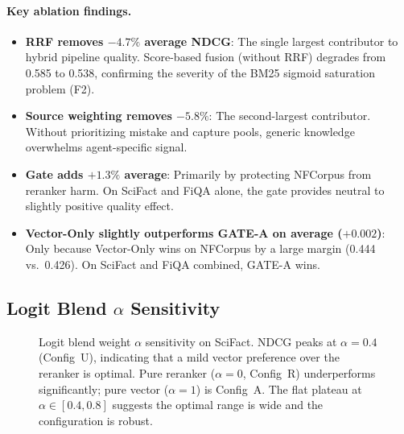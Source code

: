 \documentclass[11pt]{article}
\begin{document}
\paragraph{Key ablation findings.}
\begin{itemize}[leftmargin=2em, itemsep=3pt]
  \item \textbf{RRF removes $-4.7\%$ average NDCG}: The single largest contributor to
  hybrid pipeline quality. Score-based fusion (without RRF) degrades from 0.585 to
  0.538, confirming the severity of the BM25 sigmoid saturation problem (F2).
  \item \textbf{Source weighting removes $-5.8\%$}: The second-largest contributor. Without
  prioritizing mistake and capture pools, generic knowledge overwhelms agent-specific
  signal.
  \item \textbf{Gate adds $+1.3\%$ average}: Primarily by protecting NFCorpus from
  reranker harm. On SciFact and FiQA alone, the gate provides neutral to slightly
  positive quality effect.
  \item \textbf{Vector-Only slightly outperforms GATE-A on average ($+0.002$)}: Only
  because Vector-Only wins on NFCorpus by a large margin (0.444 vs.\ 0.426). On
  SciFact and FiQA combined, GATE-A wins.
\end{itemize}

\subsection{Logit Blend $\alpha$ Sensitivity}

\begin{figure}[H]
\centering
{}
\caption{Logit blend weight $\alpha$ sensitivity on SciFact. NDCG peaks at $\alpha=0.4$
(Config~U), indicating that a mild vector preference over the reranker is optimal.
Pure reranker ($\alpha=0$, Config~R) underperforms significantly; pure vector ($\alpha=1$)
is Config~A. The flat plateau at $\alpha \in [0.4, 0.8]$ suggests the optimal range
is wide and the configuration is robust.}
\label{fig:alpha-sensitivity}
\end{figure}
\end{document}
